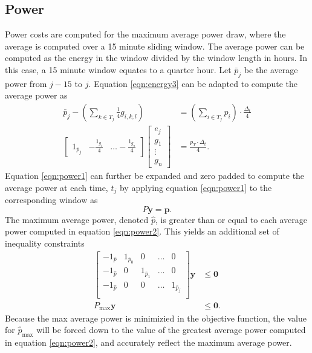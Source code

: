 \subsection{Power}
Power costs are computed for the maximum average power draw, where the average is computed over a 15 minute sliding window. The average power can be computed as the energy in the window divided by the window length in hours. In this case, a 15 minute window equates to a quarter hour. Let $\bar{p}_j$ be the average power from $j - 15$ to $j$. Equation \ref{eqn:energy3} can be adapted to compute the average power as
\begin{equation}\label{eqn:power1} 
	\begin{aligned}
		\bar{p}_j - \left ( \sum_{k\in T_j}\frac{1}{4}g_{i,k,l} \right ) &= \left ( \sum_{i\in T_j}p_i \right ) \cdot \frac{\Delta_t}{4} \\
		\begin{bmatrix} 1_{\bar{p}_j} & -\frac{1_{g_1}}{4} & \hdots -\frac{1_{g_n}}{4} \end{bmatrix} \begin{bmatrix}e_j \\ g_1 \\ \vdots \\ g_n \end{bmatrix} &= \frac{p_T \cdot \Delta_t}{4}.
	\end{aligned}
\end{equation}
Equation \ref{eqn:power1} can further be expanded and zero padded to compute the average power at each time, $t_j$ by applying equation \ref{eqn:power1} to the corresponding window as
\begin{equation}\label{eqn:power2}
	P\mathbf{y} = \mathbf{p}.	
\end{equation}
The maximum average power, denoted $\hat{p}$, is greater than or equal to each average power computed in equation \ref{eqn:power2}.  This yields an additional set of inequality constraints 
\begin{equation}\label{eqn:cPower1}
	\begin{aligned}
		 \begin{bmatrix} 
			-1_{\hat{p}} & 1_{\bar{p}_0} & 0             & \hdots & 0 \\ 
	        	-1_{\hat{p}} & 0       & 1_{\bar{p}_1} & \hdots & 0\\
			-1_{\hat{p}} & 0       & 0 & \hdots    & 1_{\bar{p}_j} \\
		 \end{bmatrix}\mathbf{y} &\le \mathbf{0} \\ 
		 P_{\text{max}}\mathbf{y} &\le \mathbf{0}.
	\end{aligned}
\end{equation}
Because the max average power is minimizied in the objective function, the value for $\hat{p}_{\text{max}}$ will be forced down to the value of the greatest average power computed in equation \ref{eqn:power2}, and accurately reflect the maximum average power.
